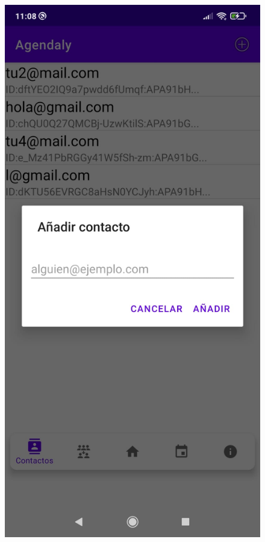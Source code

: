 \documentclass[a4paper,openright,12pt]{article}
\begin{document}
\begin{figure}
    \includegraphics[scale=0.05]{add_contact.jpeg}\hfill

\end{figure}
\end{document}
